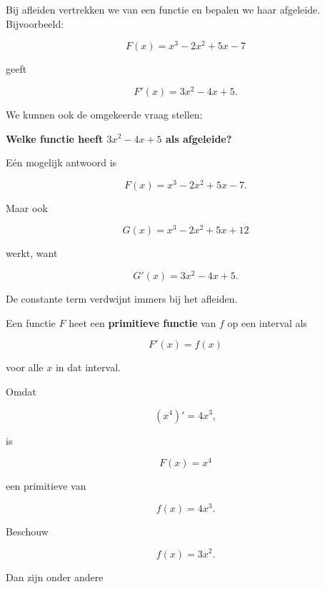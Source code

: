 \documentclass{ximera}
\begin{document}


Bij afleiden vertrekken we van een functie en bepalen we haar
afgeleide. Bijvoorbeeld:

\[
F(x)=x^3-2x^2+5x-7
\]

geeft

\[
F'(x)=3x^2-4x+5.
\]

We kunnen ook de omgekeerde vraag stellen:

\begin{center}
\textbf{Welke functie heeft \(3x^2-4x+5\) als afgeleide?}
\end{center}

Eén mogelijk antwoord is

\[
F(x)=x^3-2x^2+5x-7.
\]

Maar ook

\[
G(x)=x^3-2x^2+5x+12
\]

werkt, want

\[
G'(x)=3x^2-4x+5.
\]

De constante term verdwijnt immers bij het afleiden.

\begin{definitie}
Een functie \(F\) heet een \textbf{primitieve functie} van \(f\) op een
interval als

\[
\boxed{F'(x)=f(x)}
\]

voor alle \(x\) in dat interval.
\end{definitie}

\begin{voorbeeld}
Omdat

\[
\left(x^4\right)'=4x^3,
\]

is

\[
F(x)=x^4
\]

een primitieve van

\[
f(x)=4x^3.
\]
\end{voorbeeld}



Beschouw

\[
f(x)=3x^2.
\]

Dan zijn onder andere
\end{document}
